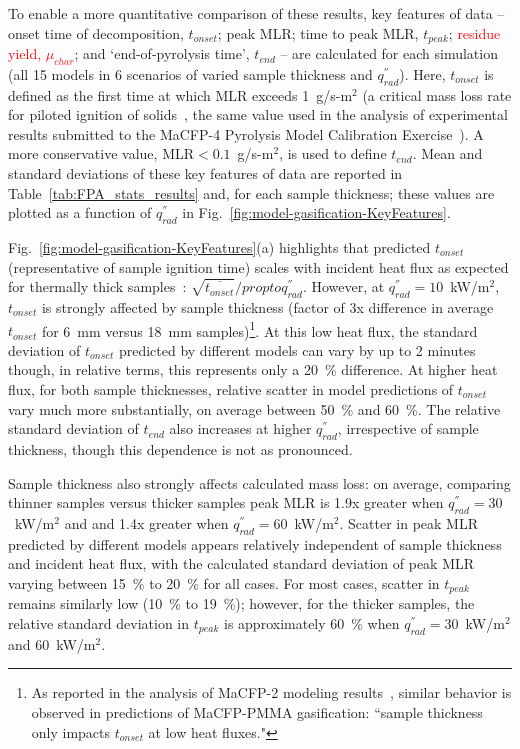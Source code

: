 \documentclass{article}
\begin{document}
\FloatBarrier
To enable a more quantitative comparison of these results, key features of data -- onset time of decomposition, $t_{onset}$; peak MLR; time to peak MLR, $t_{peak}$; \textcolor{red}{residue yield, $\mu_{char}$}; and `end-of-pyrolysis time', $t_{end}$ -- are calculated for each simulation (all 15 models in 6 scenarios of varied sample thickness and $q^{''}_{rad}$). Here, $t_{onset}$ is defined as the first time at which MLR exceeds 1~g/s-m$^2$ (a critical mass loss rate for piloted ignition of solids~\cite{lyon2007criteria}, the same value used in the analysis of experimental results submitted to the MaCFP-4 Pyrolysis Model Calibration Exercise~\cite{MaCFP4PyrolysisExp}). A more conservative value, MLR$<0.1$~g/s-m$^2$, is used to define $t_{end}$. Mean and standard deviations of these key features of data are reported in Table~\ref{tab:FPA_stats_results} and, for each sample thickness; these values are plotted as a function of $q^{''}_{rad}$ in Fig.~\ref{fig:model-gasification-KeyFeatures}.

Fig.~\ref{fig:model-gasification-KeyFeatures}(a) highlights that predicted $t_{onset}$ (representative of sample ignition time) scales with incident heat flux as expected for thermally thick samples~\cite{quintiere2006fundamentals}: $\sqrt{\overbar{t_{onset}}} /propto q^{''}_{rad}$. However, at $q^{''}_{rad}=10$~kW/m$^2$, $t_{onset}$ is strongly affected by sample thickness (factor of 3x difference in average $t_{onset}$ for 6~mm versus 18~mm samples)\footnote{As reported in the analysis of MaCFP-2 modeling results~\cite{MaCFP2-ModelingSlides}, similar behavior is observed in predictions of MaCFP-PMMA gasification: ``sample thickness only impacts $t_{onset}$ at low heat fluxes."}. At this low heat flux, the standard deviation of $t_{onset}$ predicted by different models can vary by up to 2 minutes though, in relative terms, this represents only a 20~\% difference. At higher heat flux, for both sample thicknesses, relative scatter in model predictions of $t_{onset}$ vary much more substantially, on average between 50~\% and 60~\%. The relative standard deviation of $t_{end}$ also increases at higher $q^{''}_{rad}$, irrespective of sample thickness, though this dependence is not as pronounced. 

Sample thickness also strongly affects calculated mass loss: on average, comparing thinner samples versus thicker samples peak MLR is 1.9x greater when $q^{''}_{rad}=30$~kW/m$^2$ and and 1.4x greater when $q^{''}_{rad}=60$~kW/m$^2$. Scatter in peak MLR predicted by different models appears relatively independent of sample thickness and incident heat flux, with the calculated standard deviation of peak MLR varying between 15~\% to 20~\% for all cases. For most cases, scatter in $t_{peak}$ remains similarly low (10~\% to 19~\%); however, for the thicker samples, the relative standard deviation in $t_{peak}$ is approximately 60~\% when $q^{''}_{rad}=30$~kW/m$^2$ and 60~kW/m$^2$.
\end{document}
